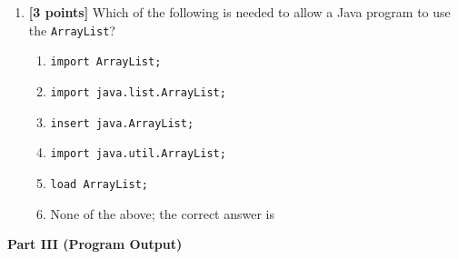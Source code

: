 \documentclass[12pt]{article}
\begin{document}
\begin{enumerate}
\item {\bf [3 points]}
  Which of the following is needed to allow a Java program to use the {\tt ArrayList}?
  \begin{enumerate}
    \item {\tt import ArrayList;}
      \medskip 
    \item {\tt import java.list.ArrayList;}
      \medskip 
    \item {\tt insert java.ArrayList;}
      \medskip
    \item {\tt import java.util.ArrayList;}
      \medskip
    \item {\tt load ArrayList;}
      \medskip
    \item None of the above; the correct answer is \underline{\hspace{3in}}
  \end{enumerate}

\bigskip
\bigskip
\bigskip



\bigskip
\bigskip

\end{enumerate}

\newpage

\noindent
{\bf Part III (Program Output)}
\end{document}
